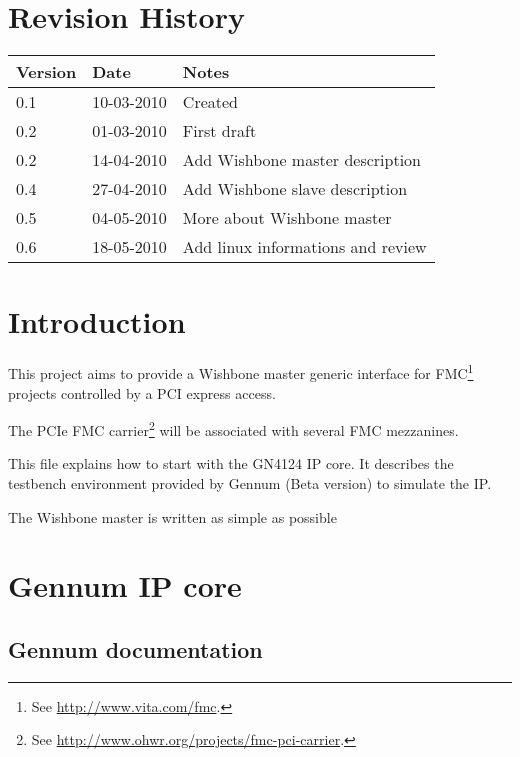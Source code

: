 \documentclass[10pt,a4paper]{cerndoc}
\begin{document}
\cerntitle
\section*{Revision History}
\begin{tabularx}{\textwidth}{|p{3cm}|p{3cm}|X|}
\hline \textbf{Version}&\textbf{Date}&\textbf{Notes}\\ \hline \hline
0.1 & 10-03-2010 & Created\\ \hline
0.2 & 01-03-2010 & First draft\\ \hline
0.2 & 14-04-2010 & Add Wishbone master description \\ \hline
0.4 & 27-04-2010 & Add Wishbone slave description\\ \hline
0.5 & 04-05-2010 & More about Wishbone master\\ \hline
0.6 & 18-05-2010 & Add linux informations and review\\ \hline
\end{tabularx}

\tableofcontents
\listoffigures
\clearpage

\section*{Introduction}
This project aims to provide a Wishbone master generic interface for FMC\footnote{See \href{http://www.vita.com/fmc}{http://www.vita.com/fmc}.} projects controlled by a PCI express access.

The PCIe FMC carrier\footnote{See \href{http://www.ohwr.org/projects/fmc-pci-carrier}{http://www.ohwr.org/projects/fmc-pci-carrier}.} will be associated with several FMC mezzanines.

This file explains how to start with the GN4124 IP core. It describes the testbench environment provided by Gennum (Beta version) to simulate the IP. 

The Wishbone master is written as simple as possible

\section{Gennum IP core}
\subsection{Gennum documentation}
\end{document}
